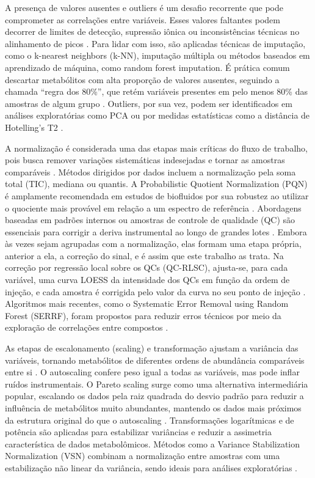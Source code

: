 A presença de valores ausentes e outliers é um desafio recorrente que pode comprometer as correlações entre variáveis. Esses valores faltantes podem decorrer de limites de detecção, supressão iônica ou inconsistências técnicas no alinhamento de picos \cite{sun2024pretreating}. Para lidar com isso, são aplicadas técnicas de imputação, como o k-nearest neighbors (k-NN), imputação múltipla ou métodos baseados em aprendizado de máquina, como random forest imputation. É prática comum descartar metabólitos com alta proporção de valores ausentes, seguindo a chamada “regra dos 80\%”, que retém variáveis presentes em pelo menos 80\% das amostras de algum grupo \cite{sun2024pretreating}. Outliers, por sua vez, podem ser identificados em análises exploratórias como PCA ou por medidas estatísticas como a distância de Hotelling’s T2 \cite{schiffman2018data}.

A normalização é considerada uma das etapas mais críticas do fluxo de trabalho, pois busca remover variações sistemáticas indesejadas e tornar as amostras comparáveis \cite{sun2024pretreating}. Métodos dirigidos por dados incluem a normalização pela soma total (TIC), mediana ou quantis. A Probabilistic Quotient Normalization (PQN) é amplamente recomendada em estudos de biofluidos por sua robustez ao utilizar o quociente mais provável em relação a um espectro de referência \cite{picone2026integrating}. Abordagens baseadas em padrões internos ou amostras de controle de qualidade (QC) são essenciais para corrigir a deriva instrumental ao longo de grandes lotes \cite{datanor}. Embora às vezes sejam agrupadas com a normalização, elas formam uma etapa própria, anterior a ela, a correção do sinal, e é assim que este trabalho as trata. Na correção por regressão local sobre os QCs (QC-RLSC), ajusta-se, para cada variável, uma curva LOESS da intensidade dos QCs em função da ordem de injeção, e cada amostra é corrigida pelo valor da curva no seu ponto de injeção \cite{dunn2011procedures}. Algoritmos mais recentes, como o Systematic Error Removal using Random Forest (SERRF), foram propostos para reduzir erros técnicos por meio da exploração de correlações entre compostos \cite{fan2019systematic}.

As etapas de escalonamento (scaling) e transformação ajustam a variância das variáveis, tornando metabólitos de diferentes ordens de abundância comparáveis entre si \cite{sun2024pretreating}. O autoscaling confere peso igual a todas as variáveis, mas pode inflar ruídos instrumentais. O Pareto scaling surge como uma alternativa intermediária popular, escalando os dados pela raiz quadrada do desvio padrão para reduzir a influência de metabólitos muito abundantes, mantendo os dados mais próximos da estrutura original do que o autoscaling \cite{mayonu2026evaluation}. Transformações logarítmicas e de potência são aplicadas para estabilizar variâncias e reduzir a assimetria característica de dados metabolômicos. Métodos como a Variance Stabilization Normalization (VSN) combinam a normalização entre amostras com uma estabilização não linear da variância, sendo ideais para análises exploratórias \cite{sun2024pretreating}.

